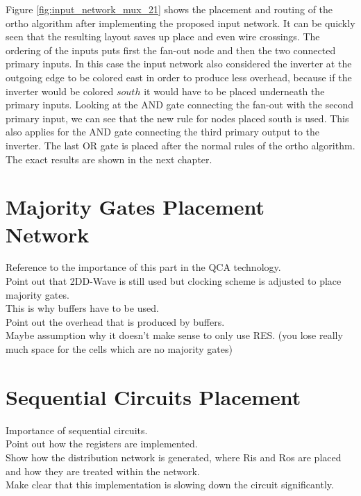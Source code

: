 Figure \ref{fig:input_network_mux_21} shows the placement and routing of the ortho algorithm after implementing the proposed input network. It can be quickly seen that the resulting layout saves up place and even wire crossings. The ordering of the inputs puts first the fan-out node and then the two connected primary inputs. In this case the input network also considered the inverter at the outgoing edge to be colored east in order to produce less overhead, because if the inverter would be colored $south$ it would have to be placed underneath the primary inputs. Looking at the AND gate connecting the fan-out with the second primary input, we can see that the new rule for nodes placed south is used. This also applies for the AND gate connecting the third primary output to the inverter. The last OR gate is placed after the normal rules of the ortho algorithm. The exact results are shown in the next chapter.

\section{Majority Gates Placement Network}
Reference to the importance of this part in the QCA technology. \\
Point out that 2DD-Wave is still used but clocking scheme is adjusted to place majority gates.\\
This is why buffers have to be used.\\
Point out the overhead that is produced by buffers.\\
Maybe assumption why it doesn't make sense to only use RES. (you lose really much space for the cells which are no majority gates)


\section{Sequential Circuits Placement}

Importance of sequential circuits.\\
Point out how the registers are implemented.\\
Show how the distribution network is generated, where Ris and Ros are placed and how they are treated within the network.\\
Make clear that this implementation is slowing down the circuit significantly.